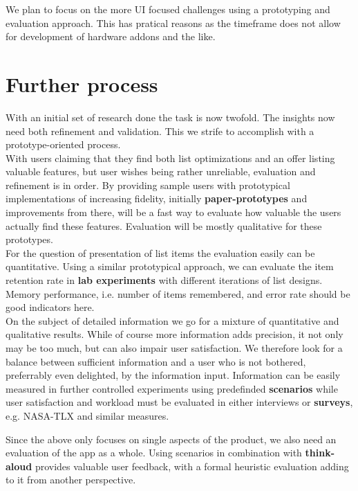 \documentclass{scrartcl}
\begin{document}
We plan to focus on the more UI focused challenges using a prototyping and evaluation approach. This has pratical reasons as the timeframe does not allow for development of hardware addons and the like.

\section{Further process}
\label{sec:process}
With an initial set of research done the task is now twofold. The insights now need both refinement and validation. This we strife to accomplish with a prototype-oriented process.\\

With users claiming that they find both list optimizations and an offer listing valuable features, but user wishes being rather unreliable, evaluation and refinement is in order.
By providing sample users with prototypical implementations of increasing fidelity, initially \textbf{paper-prototypes} and improvements from there, will be a fast way to evaluate how valuable the users actually find these features. 
Evaluation will be mostly qualitative for these prototypes. \\

For the question of presentation of list items the evaluation easily can be quantitative. Using a similar prototypical approach, we can evaluate the item retention rate in \textbf{lab experiments} with different iterations of list designs.
Memory performance, i.e. number of items remembered, and error rate should be good indicators here.\\

On the subject of detailed information we go for a mixture of quantitative and qualitative results. While of course more information adds precision, it not only may be too much, but can also impair user satisfaction.
We therefore look for a balance between sufficient information and a user who is not bothered, preferrably even delighted, by the information input.
Information can be easily measured in further controlled experiments using predefinded \textbf{scenarios} while user satisfaction and workload must be evaluated in either interviews or \textbf{surveys}, e.g. NASA-TLX and similar measures. 

Since the above only focuses on single aspects of the product, we also need an evaluation of the app as a whole. Using scenarios in combination with \textbf{think-aloud} provides valuable user feedback, with a formal heuristic evaluation adding to it from another perspective.
\end{document}
